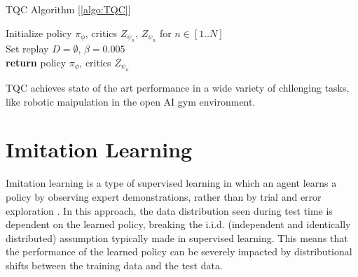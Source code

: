\begin{algorithm}
    \caption{TQC Algorithm [\ref{algo:TQC}]}
    \label{algo:TQC}
    \begin{algorithmic}
        \State Initialize policy $\pi_{\phi}$, critics $Z_{\psi_n}$, $Z_{\psi_n}$ for $n \in [1..N]$\\
        \State Set replay $D = \emptyset$, $\beta = 0.005$\\
        \State \textbf{return} policy $\pi_{\phi}$, critics $Z_{\psi_n}$
    \end{algorithmic}
\end{algorithm}
TQC achieves state of the art performance in a wide variety of chllenging tasks, like robotic maipulation in the open AI gym environment.

\section{Imitation Learning}
Imitation learning is a type of supervised learning in which an agent learns a policy by observing expert demonstrations, 
rather than by trial and error exploration \cite{IL}. In this approach, the data distribution seen during test time is dependent on the learned policy, 
breaking the i.i.d. (independent and identically distributed) assumption typically made in supervised learning. This means that the performance of the 
learned policy can be severely impacted by distributional shifts between the training data and the test data. \\ \\

